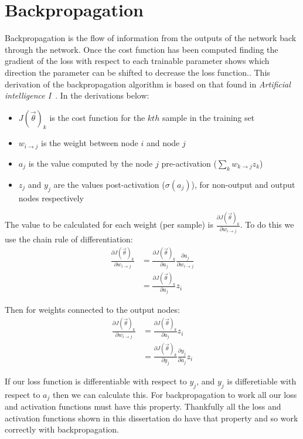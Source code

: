 \appendix

\chapter{Backpropagation} \label{backprop}

Backpropagation is the flow of information from the outputs of the network back through the network. Once the cost function has been computed
finding the gradient of the loss with respect to each trainable parameter shows which direction the parameter can be shifted to decrease 
the loss function.. This derivation of the backpropagation algorithm is based on that found in \textit{Artificial intelligence I}~\cite{Art_Int}.
In the derivations below:
\begin{itemize}
  \item $J(\vec{\theta})_k$ is the cost function for the $kth$ sample in the training set
  \item $w_{i \to j}$ is the weight between node $i$ and node $j$
  \item $a_j$ is the value computed by the node $j$ pre-activation ($\sum_{k} w_{k \to j} z_k$)
  \item $z_j$ and $y_j$ are the values post-activation ($\sigma(a_j)$), for non-output and output nodes respectively
\end{itemize}

The value to be calculated for each weight (per sample) is $\frac{\partial J(\vec{\theta})_k}{\partial w_{i \to j}}$. To do this we use the chain rule
of differentiation:
\begin{align}
  \frac{\partial J(\vec{\theta})_k}{\partial w_{i \to j}} & = \frac{\partial J(\vec{\theta})_k}{\partial a_j} \frac{\partial a_j}{\partial w_{i \to j}} \\
  & = \frac{\partial J(\vec{\theta})_k}{\partial a_j} z_i
\end{align}

Then for weights connected to the output nodes:
\begin{align}
  \frac{\partial J(\vec{\theta})_k}{\partial w_{i \to j}} & = \frac{\partial J(\vec{\theta})_k}{\partial a_j} z_i \\
  & = \frac{\partial J(\vec{\theta})_k}{\partial y_j} \frac{\partial y_j}{\partial a_j} z_i
\end{align}

If our loss function is differentiable with respect to $y_j$, and $y_j$ is differetiable with respect to $a_j$ then we can calculate this.  
For backpropagation to work all our loss and activation functions must have this property. Thankfully all the loss and activation functions 
shown in this dissertation do have that property and so work correctly with backpropagation.

